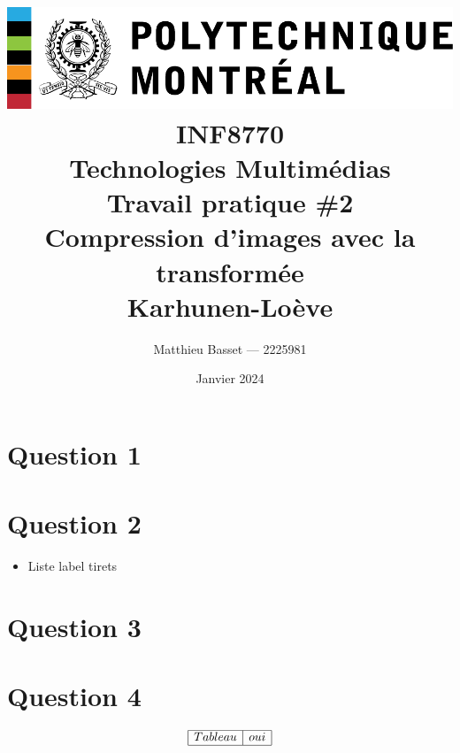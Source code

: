 \documentclass{article}[letterpaper, 11pt]
\title{
    \includegraphics[scale=0.8]{poly-logo.pdf}\\\vspace*{50pt}
    \huge\textbf{INF8770}\\
    \textbf{Technologies Multimédias}\\
    Travail pratique \#2\\
    Compression d'images avec la transformée \\Karhunen-Loève\\
}
\author{\Large Matthieu Basset --- 2225981}
\date{\huge Janvier 2024}
\renewcommand{\thepage}{}
\begin{document}
\thispagestyle{empty}
\maketitle

\newpage

\renewcommand{\thepage}{\arabic{page}}
\pagestyle{fancy}
\renewcommand{\contentsname}{Table des matières}
\setcounter{page}{1}

\tableofcontents


\newpage

\section{Question 1}


\newpage
\section{Question 2}


\begin{itemize}[label={--}]
	\item Liste label tirets
\end{itemize}


\newpage
\section{Question 3}

\newpage
\section{Question 4}
\[
\begin{array}{|l|c|} \hline %
Tableau & oui\\ \hline %
\end{array}\]



\end{document}
